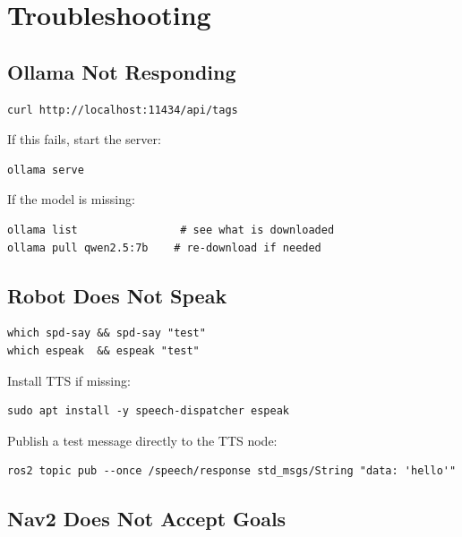 \documentclass[12pt,a4paper]{report}
\begin{document}
\section{Troubleshooting}

\subsection{Ollama Not Responding}

\begin{lstlisting}[style=bashstyle]
curl http://localhost:11434/api/tags
\end{lstlisting}

If this fails, start the server:

\begin{lstlisting}[style=bashstyle]
ollama serve
\end{lstlisting}

If the model is missing:

\begin{lstlisting}[style=bashstyle]
ollama list                # see what is downloaded
ollama pull qwen2.5:7b    # re-download if needed
\end{lstlisting}

\subsection{Robot Does Not Speak}

\begin{lstlisting}[style=bashstyle]
which spd-say && spd-say "test"
which espeak  && espeak "test"
\end{lstlisting}

Install TTS if missing:

\begin{lstlisting}[style=bashstyle]
sudo apt install -y speech-dispatcher espeak
\end{lstlisting}

Publish a test message directly to the TTS node:

\begin{lstlisting}[style=bashstyle]
ros2 topic pub --once /speech/response std_msgs/String "data: 'hello'"
\end{lstlisting}

\subsection{Nav2 Does Not Accept Goals}
\end{document}
